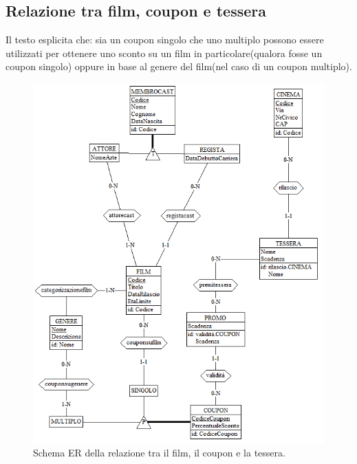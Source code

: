 \documentclass[a4paper,12pt]{report}
\begin{document}
	\subsection{Relazione tra film, coupon e tessera}
	Il testo esplicita che: sia un coupon singolo che uno multiplo possono essere utilizzati per ottenere uno sconto su un film in particolare(qualora fosse un coupon singolo) oppure in base al genere del film(nel caso di un coupon multiplo).
	\begin{figure}[H]
		\centering
		\includegraphics[width=0.9\linewidth]{ER/filmcoupontessera.png}
		\caption{Schema ER della relazione tra il film, il coupon e la tessera.}
	\end{figure}
\end{document}

